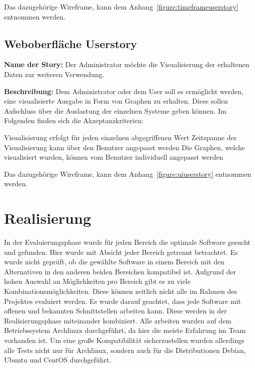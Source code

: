 Das dazugehörige Wireframe, kann dem Anhang~\ref{figure:timeframeuserstory}
entnommen werden.
\mr%

\section{Weboberfläche Userstory}
\textbf{Name der Story:} Der Administrator möchte die Visualisierung der
erhaltenen Daten zur weiteren Verwendung.

\textbf{Beschreibung:} Dem Administrator oder dem User soll es ermöglicht
werden, eine visualisierte Ausgabe in Form von Graphen zu erhalten. Diese
sollen Aufschluss über die Auslastung der einzelnen Systeme geben können. Im
Folgenden finden sich die Akzeptanzkriterien:

\begin{outline}
  \1 Visualisierung erfolgt für jeden einzelnen abgegriffenen Wert
  \1 Zeitspanne der Visualisierung kann über den Benutzer angepasst werden
  \1 Die Graphen, welche visualisiert wurden, können vom Benutzer individuell
  angepasst werden
\end{outline}

Das dazugehörige Wireframe, kann dem Anhang~\ref{figure:uiuserstory}
entnommen werden.
\mr%

\chapter{Realisierung}
In der Evaluierungsphase wurde für jeden Bereich die optimale Software gesucht
und gefunden. Hier wurde mit Absicht jeder Bereich getrennt betrachtet. Es
wurde nicht geprüft, ob die gewählte Software in einem Bereich mit den
Alternativen in den anderen beiden Bereichen kompatibel ist. Aufgrund der hohen
Auswahl an Möglichkeiten pro Bereich gibt es zu viele
Kombinationsmöglichkeiten. Diese können zeitlich nicht alle im Rahmen des
Projektes evaluiert werden. Es wurde darauf geachtet, dass jede Software mit
offenen und bekannten Schnittstellen arbeiten kann. Diese werden in der
Realisierungsphase miteinander kombiniert. Alle arbeiten wurden auf dem
Betriebssystem Archlinux durchgeführt, da hier die meiste Erfahrung im Team
vorhanden ist. Um eine große Kompatibilität sicherzustellen wurden allerdings
alle Tests nicht nur für Archlinux, sondern auch für die Distributionen Debian,
Ubuntu und CentOS durchgeführt.

